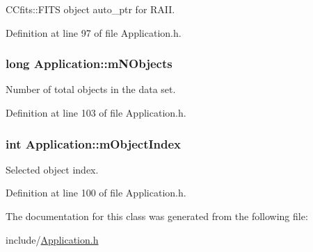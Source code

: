 CCfits::FITS object auto\_\-ptr for RAII. 



Definition at line 97 of file Application.h.

\hypertarget{classApplication_a00c7b15dab943a50ef2a0c77c36fd1bf}{
\subsubsection[{mNObjects}]{\setlength{\rightskip}{0pt plus 5cm}long {\bf Application::mNObjects}}}
\label{classApplication_a00c7b15dab943a50ef2a0c77c36fd1bf}


Number of total objects in the data set. 



Definition at line 103 of file Application.h.

\hypertarget{classApplication_a05a6755ede527481e2a6a885120f86b0}{
\subsubsection[{mObjectIndex}]{\setlength{\rightskip}{0pt plus 5cm}int {\bf Application::mObjectIndex}}}
\label{classApplication_a05a6755ede527481e2a6a885120f86b0}


Selected object index. 



Definition at line 100 of file Application.h.



The documentation for this class was generated from the following file:\begin{DoxyCompactItemize}
\item 
include/\hyperlink{Application_8h}{Application.h}\end{DoxyCompactItemize}
